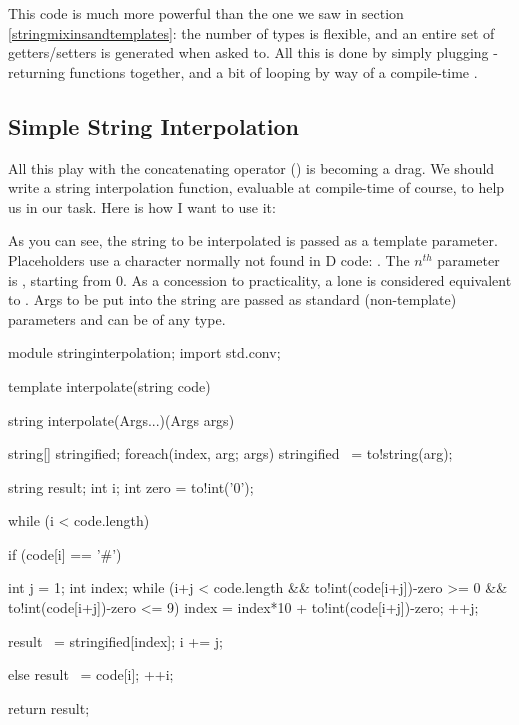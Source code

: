 This code is much more powerful than the one we saw in section \ref{stringmixinsandtemplates}: the number of types is flexible, and an entire set of getters/setters is generated when asked to. All this is done by simply plugging -returning functions together, and a bit of looping by way of a compile-time .

\subsection{Simple String Interpolation}\label{stringinterpolation}

All this play with the concatenating operator (\DD{\~}) is becoming a drag. We should write a string interpolation function, evaluable at compile-time of course, to help us in our task. Here is how I want to use it:


As you can see, the string to be interpolated is passed as a template parameter. Placeholders use a character normally not found in D code: \DD{\#}. The $n^{th}$ parameter is , starting from 0. As a concession to practicality, a lone \DD{\#} is considered equivalent to . Args to be put into the string are passed as standard (non-template) parameters and can be of any type.

\begin{dcode}
module stringinterpolation;
import std.conv;

template interpolate(string code)
{
    string interpolate(Args...)(Args args) {
        string[] stringified;
        foreach(index, arg; args) stringified ~= to!string(arg);

        string result;
        int i;
        int zero = to!int('0');

        while (i < code.length) {
            if (code[i] == '#') {
                int j = 1;
                int index;
                while (i+j < code.length
                    && to!int(code[i+j])-zero >= 0
                    && to!int(code[i+j])-zero <= 9)
                {
                    index = index*10 + to!int(code[i+j])-zero;
                    ++j;
                }

                result ~= stringified[index];
                i += j;
            }
            else {
                result ~= code[i];
                ++i;
            }
        }

        return result;
    }
}
\end{dcode}

